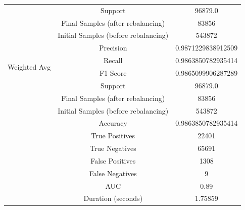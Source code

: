 \begin{longtable}{|c|c|c|}
 & Support & 96879.0 \\
 & Final Samples (after rebalancing) & 83856 \\
 & Initial Samples (before rebalancing) & 543872 \\
\hline
\multirow{4}{*}{Weighted Avg} & Precision & 0.9871229838912509 \\
 & Recall & 0.9863850782935414 \\
 & F1 Score & 0.9865099906287289 \\
 & Support & 96879.0 \\
 & Final Samples (after rebalancing) & 83856 \\
 & Initial Samples (before rebalancing) & 543872 \\
\hline
& Accuracy & 0.9863850782935414 \\ \hline
& True Positives & 22401 \\ \hline
& True Negatives & 65691 \\ \hline
& False Positives & 1308 \\ \hline
& False Negatives & 9 \\ \hline
& AUC & 0.89 \\ \hline
& Duration (seconds) & 1.75859 \\ \hline
\end{longtable}


